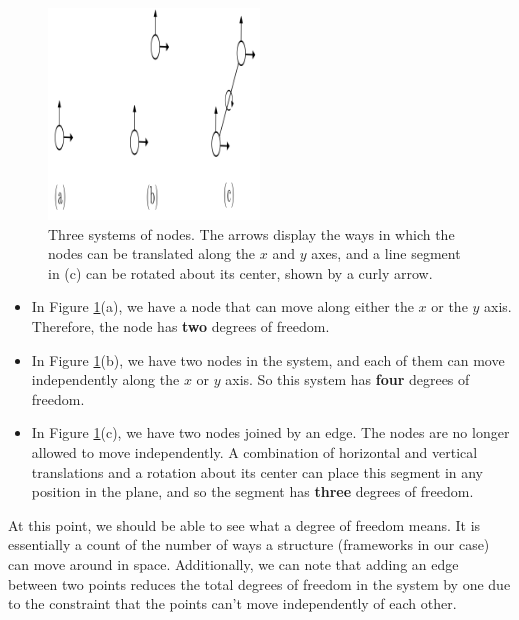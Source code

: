 \begin{figure}[htbp]
    \centering
    \includegraphics[width = 0.5\textwidth]{Chapter 3/14. degree_of_freedom 2.0.png}
    \caption{Three systems of nodes. The arrows display the ways in which the nodes can be translated along the $x$ and $y$ axes, and a line segment in (c) can be rotated about its center, shown by a curly arrow.}
    \label{fig: degree of freedom example}
\end{figure}
\vspace{-3mm}
\begin{flushleft}
\begin{itemize}
    \item In Figure \ref{fig: degree of freedom example}(a), we have a node that can move along either the $x$ or the $y$ axis. Therefore, the node has \textbf{two} degrees of freedom.
    
    \item In Figure \ref{fig: degree of freedom example}(b), we have two nodes in the system, and each of them can move independently along the $x$ or $y$ axis. So this system has \textbf{four} degrees of freedom.
    
    \item In Figure \ref{fig: degree of freedom example}(c), we have two nodes joined by an edge. The nodes are no longer allowed to move independently. A combination of horizontal and vertical translations and
    a rotation about its center can place this segment in any position in the plane, and so the segment has \textbf{three} degrees of freedom.
\end{itemize}
\end{flushleft}

\begin{flushleft}
At this point, we should be able to see what a degree of freedom means. It is essentially a count of the number of ways a structure (frameworks in our case) can move around in space. Additionally, we can note that adding an edge between two points reduces the total degrees of freedom in the system by one due to the constraint that the points can't move independently of each other. 
\end{flushleft}

